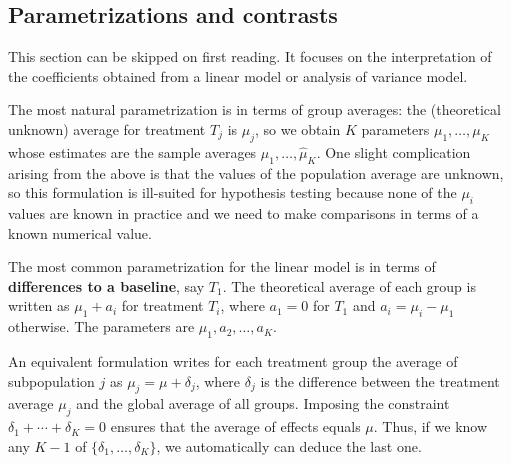 \documentclass[
  11pt,
  letterpaper,
]{scrbook}
\theoremstyle{definition}
\theoremstyle{definition}
\theoremstyle{remark}
\begin{document}
\subsection{Parametrizations and
contrasts}\label{parametrizations-and-contrasts}

This section can be skipped on first reading. It focuses on the
interpretation of the coefficients obtained from a linear model or
analysis of variance model.

The most natural parametrization is in terms of group averages: the
(theoretical unknown) average for treatment \(T_j\) is \(\mu_j\), so we
obtain \(K\) parameters \(\mu_1, \ldots, \mu_K\) whose estimates are the
sample averages \(\widehat{\mu}_1, \ldots, \widehat{\mu}_K\). One slight
complication arising from the above is that the values of the population
average are unknown, so this formulation is ill-suited for hypothesis
testing because none of the \(\mu_i\) values are known in practice and
we need to make comparisons in terms of a known numerical value.

The most common parametrization for the linear model is in terms of
\textbf{differences to a baseline}, say \(T_1\). The theoretical average
of each group is written as \(\mu_1 + a_i\) for treatment \(T_i\), where
\(a_1=0\) for \(T_1\) and \(a_i = \mu_i-\mu_1\) otherwise. The
parameters are \(\mu_1, a_2, \ldots, a_K\).

An equivalent formulation writes for each treatment group the average of
subpopulation \(j\) as \(\mu_j = \mu + \delta_j\), where \(\delta_j\) is
the difference between the treatment average \(\mu_j\) and the global
average of all groups. Imposing the constraint
\(\delta_1 + \cdots + \delta_K=0\) ensures that the average of effects
equals \(\mu\). Thus, if we know any \(K-1\) of
\(\{\delta_1, \ldots, \delta_K\}\), we automatically can deduce the last
one.
\end{document}
